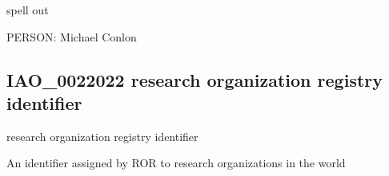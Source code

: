 \documentclass[letterpaper,10pt,english]{sphinxmanual}
\begin{document}
\begin{sphinxShadowBox}

\sphinxAtStartPar
spell out
\end{sphinxShadowBox}

\begin{sphinxShadowBox}

\sphinxAtStartPar
{}
\end{sphinxShadowBox}

\begin{sphinxShadowBox}

\sphinxAtStartPar
PERSON: Michael Conlon
\end{sphinxShadowBox}
\begin{quote}

\ignorespaces \end{quote}


\subsection{IAO\_0022022 \sphinxhyphen{} research organization registry identifier}
\label{\detokenize{doc-IAO_0022022:iao-0022022-research-organization-registry-identifier}}\label{\detokenize{doc-IAO_0022022:index-0}}\label{\detokenize{doc-IAO_0022022::doc}}
\begin{sphinxShadowBox}

\sphinxAtStartPar
research organization registry identifier
\end{sphinxShadowBox}

\begin{sphinxShadowBox}

\sphinxAtStartPar
An identifier assigned by ROR to research organizations in the world
\end{sphinxShadowBox}

\begin{sphinxShadowBox}

\sphinxAtStartPar
{}
\end{sphinxShadowBox}
\end{document}
